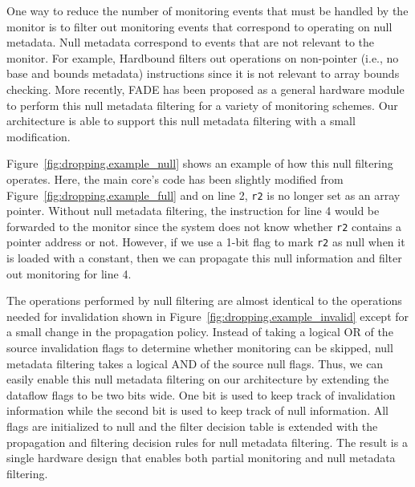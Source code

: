 One way to reduce the number of monitoring events that must be handled by the
monitor is to filter out monitoring events that correspond to operating on null
metadata. Null metadata correspond to events that
are not relevant to the monitor. For example, Hardbound
\cite{hardbound-asplos08} filters out operations on non-pointer (i.e., no base
and bounds metadata) instructions since it is not relevant to array bounds
checking. More recently, FADE \cite{fade-hpca14} has been proposed as a general
hardware module to perform this null metadata filtering for a variety of
monitoring schemes. Our architecture is able to support this null metadata
filtering with a small modification.

Figure~\ref{fig:dropping.example_null} shows an example of how this null filtering operates.
Here, the main core's code has been slightly modified from
Figure~\ref{fig:dropping.example_full} and on line 2, {\tt r2} is no longer set as an array pointer.
Without null metadata filtering, the instruction for line 4 would be
forwarded to the monitor since the system does not know whether {\tt r2}
contains a pointer address or not. However, if we use a 1-bit flag to mark {\tt r2}
as null when it is loaded with a constant, then we can propagate this null
information and filter out monitoring for line 4.

The operations performed by null filtering are almost identical to the
operations needed for invalidation shown in
Figure~\ref{fig:dropping.example_invalid} except for a small change in the propagation policy. Instead of taking a logical OR of the
source invalidation flags to determine whether monitoring can be skipped, null
metadata filtering takes a logical AND of the source null flags.
Thus, we can easily enable this null metadata filtering on our architecture by
extending the dataflow flags to be two bits wide. One bit is used to
keep track of invalidation information while the second bit is used to keep
track of null information. All flags are initialized to null and the filter
decision table is extended with the propagation and filtering decision rules
for null metadata filtering.
The result is a single hardware design that enables both partial
monitoring and null metadata filtering.


